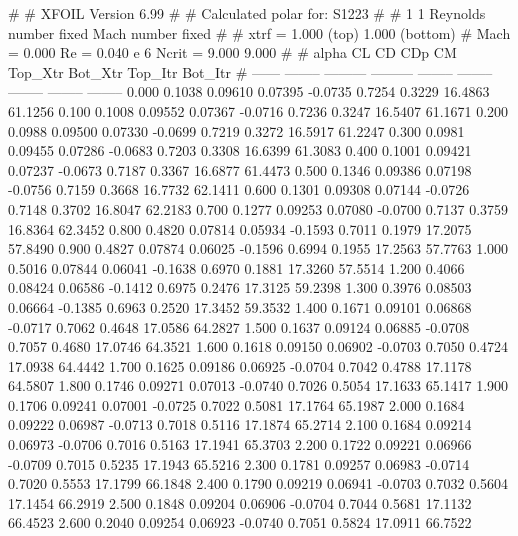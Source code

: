 #  
#       XFOIL         Version 6.99
#  
# Calculated polar for: S1223                                           
#  
# 1 1 Reynolds number fixed          Mach number fixed         
#  
# xtrf =   1.000 (top)        1.000 (bottom)  
# Mach =   0.000     Re =     0.040 e 6     Ncrit =   9.000  9.000
#  
#   alpha    CL        CD       CDp       CM     Top_Xtr  Bot_Xtr  Top_Itr  Bot_Itr
#  ------ -------- --------- --------- -------- -------- -------- -------- --------
   0.000   0.1038   0.09610   0.07395  -0.0735   0.7254   0.3229  16.4863  61.1256
   0.100   0.1008   0.09552   0.07367  -0.0716   0.7236   0.3247  16.5407  61.1671
   0.200   0.0988   0.09500   0.07330  -0.0699   0.7219   0.3272  16.5917  61.2247
   0.300   0.0981   0.09455   0.07286  -0.0683   0.7203   0.3308  16.6399  61.3083
   0.400   0.1001   0.09421   0.07237  -0.0673   0.7187   0.3367  16.6877  61.4473
   0.500   0.1346   0.09386   0.07198  -0.0756   0.7159   0.3668  16.7732  62.1411
   0.600   0.1301   0.09308   0.07144  -0.0726   0.7148   0.3702  16.8047  62.2183
   0.700   0.1277   0.09253   0.07080  -0.0700   0.7137   0.3759  16.8364  62.3452
   0.800   0.4820   0.07814   0.05934  -0.1593   0.7011   0.1979  17.2075  57.8490
   0.900   0.4827   0.07874   0.06025  -0.1596   0.6994   0.1955  17.2563  57.7763
   1.000   0.5016   0.07844   0.06041  -0.1638   0.6970   0.1881  17.3260  57.5514
   1.200   0.4066   0.08424   0.06586  -0.1412   0.6975   0.2476  17.3125  59.2398
   1.300   0.3976   0.08503   0.06664  -0.1385   0.6963   0.2520  17.3452  59.3532
   1.400   0.1671   0.09101   0.06868  -0.0717   0.7062   0.4648  17.0586  64.2827
   1.500   0.1637   0.09124   0.06885  -0.0708   0.7057   0.4680  17.0746  64.3521
   1.600   0.1618   0.09150   0.06902  -0.0703   0.7050   0.4724  17.0938  64.4442
   1.700   0.1625   0.09186   0.06925  -0.0704   0.7042   0.4788  17.1178  64.5807
   1.800   0.1746   0.09271   0.07013  -0.0740   0.7026   0.5054  17.1633  65.1417
   1.900   0.1706   0.09241   0.07001  -0.0725   0.7022   0.5081  17.1764  65.1987
   2.000   0.1684   0.09222   0.06987  -0.0713   0.7018   0.5116  17.1874  65.2714
   2.100   0.1684   0.09214   0.06973  -0.0706   0.7016   0.5163  17.1941  65.3703
   2.200   0.1722   0.09221   0.06966  -0.0709   0.7015   0.5235  17.1943  65.5216
   2.300   0.1781   0.09257   0.06983  -0.0714   0.7020   0.5553  17.1799  66.1848
   2.400   0.1790   0.09219   0.06941  -0.0703   0.7032   0.5604  17.1454  66.2919
   2.500   0.1848   0.09204   0.06906  -0.0704   0.7044   0.5681  17.1132  66.4523
   2.600   0.2040   0.09254   0.06923  -0.0740   0.7051   0.5824  17.0911  66.7522
